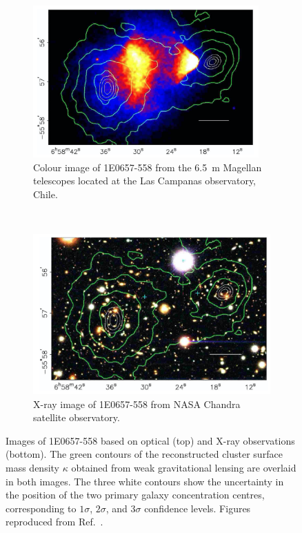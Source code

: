 \begin{figure}[htbp]
    \centering
    \begin{subfigure}{1.\textwidth}
      \centering
      \includegraphics[width=0.95\textwidth]{figures/darkmatter/bulletcluster_magellan.png}
      \caption{Colour image of 1E\num{0657}-\num{558} from the \SI{6.5}{\meter} Magellan telescopes located at the Las Campanas observatory, Chile.}
      \label{fig:dm:evidence:cluster:bullet:magellan}
    \end{subfigure}
    \\
    \begin{subfigure}{1.\textwidth}
      \centering
      \includegraphics[width=.95\textwidth]{figures/darkmatter/bulletcluster_chandra.png}
      \caption{X-ray image of 1E\num{0657}-\num{558} from NASA Chandra satellite observatory.}
      \label{fig:dm:evidence:cluster:bullet:chandra}
    \end{subfigure}
    \caption{Images of 1E\num{0657}-\num{558} based on optical (top) and X-ray observations (bottom). The green contours of the reconstructed cluster surface mass density \(\kappa\) obtained from weak gravitational lensing are overlaid in both images. The three white contours show the uncertainty in the position of the two primary galaxy concentration centres, corresponding to \(1\sigma\), \(2\sigma\), and \(3\sigma\) confidence levels. Figures reproduced from Ref.~\cite{Clowe2006}.}
    \label{fig:dm:evidence:cluster:bullet}
\end{figure}


